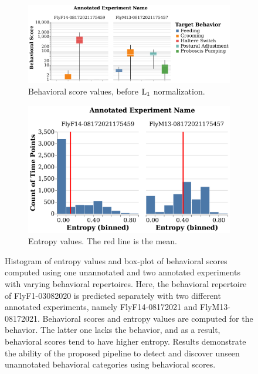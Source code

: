 \begin{figure}[htb!]
	\centering
	\begin{subfigure}[b]{0.545\linewidth}
		\centering\includegraphics[width=\linewidth]{figures/BehavioralScores-RepertoireDifference.pdf}
		\caption{Behavioral score values, before $\textnormal{L}_1$ normalization. \label{figure:repertoire-score-comparison}}
	\end{subfigure}%
	\hfill
	\begin{subfigure}[b]{0.445\linewidth}
		\centering\includegraphics[width=\linewidth]{figures/Entropy-RepertoireDifference.pdf}
		\caption{Entropy values. The red line is the mean. \label{figure:repertoire-entropy-comparison}}
	\end{subfigure}%
	\caption[Histogram of entropy values and box-plot of the behavioral scores computed using one unannotated and two annotated experiments with varying behavioral repertoires.]{Histogram of entropy values and box-plot of behavioral scores computed using one unannotated and two annotated experiments with varying behavioral repertoires.
		Here, the behavioral repertoire of FlyF1-03082020 is predicted separately with two different annotated experiments, namely FlyF14-08172021 and FlyM13-08172021.
		Behavioral scores and entropy values are computed for the \HaltereSwitch behavior.
		The latter one lacks the \HaltereSwitch behavior, and as a result, behavioral scores tend to have higher entropy.
		Results demonstrate the ability of the proposed pipeline to detect and discover unseen unannotated behavioral categories using behavioral scores.\label{figure:repertoire-difference}}
\end{figure}

